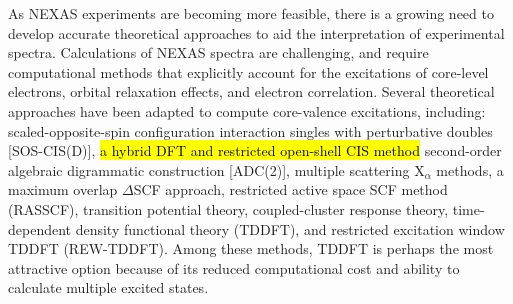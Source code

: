 \documentclass[12pt]{article}
\begin{document}
As NEXAS experiments are becoming more feasible, there is a growing need to develop accurate theoretical approaches to aid the interpretation of experimental spectra.
Calculations of NEXAS spectra are challenging, and require computational methods that explicitly account for the excitations of core-level electrons, orbital relaxation effects, and electron correlation. \cite{coriani_coupled-cluster_2012} Several theoretical approaches have been adapted to compute core-valence excitations, including: scaled-opposite-spin configuration interaction singles with perturbative doubles [SOS-CIS(D)],\cite{asmuruf_calculation_2008} \hl{a hybrid DFT and restricted open-shell CIS method}\cite{roemelt_excited_2013,roemelt_combined_2013} second-order algebraic digrammatic construction [ADC(2)],\cite{schirmer_beyond_1982,trofimov_efficient_1995} multiple scattering X$_\alpha$ methods, \cite{sheehy_correlation_1989} a maximum overlap $\Delta$SCF approach, \cite{besley_self-consistent-field_2009} restricted active space SCF method (RASSCF), \cite{agren_relaxation_1993} transition potential theory,\cite{triguero_calculations_1998} coupled-cluster response theory, \cite{coriani_coupled-cluster_2012} time-dependent density functional theory (TDDFT),\cite{stener_time_2003} and restricted excitation window TDDFT (REW-TDDFT). \cite{lopata_linear-response_2012} Among these methods, TDDFT is perhaps the most attractive option because of its reduced computational cost and ability to calculate multiple excited states.
\end{document}
